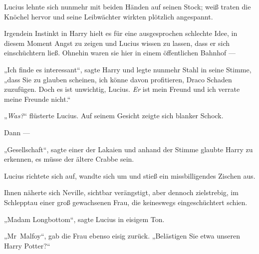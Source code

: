 Lucius lehnte sich nunmehr mit beiden Händen auf seinen Stock; weiß traten die Knöchel hervor und seine Leibwächter wirkten plötzlich angespannt.

Irgendein Instinkt in Harry hielt es für eine ausgesprochen schlechte Idee, in diesem Moment Angst zu zeigen und Lucius wissen zu lassen, dass er sich einschüchtern ließ. Ohnehin waren sie hier in einem öffentlichen Bahnhof —

„Ich finde es interessant“, sagte Harry und legte nunmehr Stahl in seine Stimme, „dass Sie zu glauben scheinen, ich könne davon profitieren, Draco Schaden zuzufügen. Doch es ist unwichtig, Lucius. \emph{Er} ist mein Freund und ich verrate meine Freunde nicht.“

„\emph{Was?}“ flüsterte Lucius. Auf seinem Gesicht zeigte sich blanker Schock.

Dann —

„Gesellschaft“, sagte einer der Lakaien und anhand der Stimme glaubte Harry zu erkennen, es müsse der ältere Crabbe sein.

Lucius richtete sich auf, wandte sich um und stieß ein missbilligendes Zischen aus.

Ihnen näherte sich Neville, sichtbar verängstigt, aber dennoch zielstrebig, im Schlepptau einer groß gewachsenen Frau, die keineswegs eingeschüchtert schien.

„Madam Longbottom“, sagte Lucius in eisigem Ton.

„Mr~Malfoy“, gab die Frau ebenso eisig zurück.
„Belästigen Sie etwa unseren Harry Potter?“

